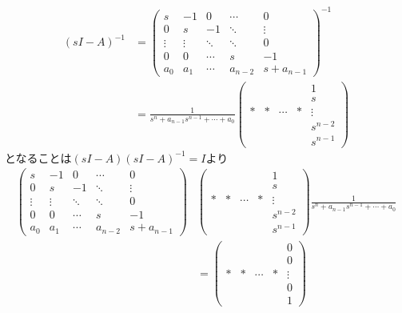 \begin{align}
 (sI-A)^{-1}
 &=
    \left(\begin{array}{ccccc}
     s      & -1     &  0     & \cdots &  0 \\
	 0      &  s     & -1     & \ddots &  \vdots \\
	 \vdots & \vdots & \ddots & \ddots &  0 \\
	 0      &  0     & \cdots & s      & -1 \\
	 a_0    &  a_1   & \cdots & a_{n-2}  &  s+a_{n-1}
	\end{array}\right)^{-1}
\nonumber\\
 &=
    \frac{1}{s^n + a_{n-1} s^{n-1}  + \cdots + a_0}
    \left(\begin{array}{ccccc}
        &    &        &    &  1 \\
	    &    &        &    &  s \\
	  * &  * & \cdots &  * &  \vdots \\
	    &    &        &    &  s^{n-2} \\
	    &    &        &    &  s^{n-1}
	\end{array}\right)
\end{align}
となることは$(sI-A)(sI-A)^{-1}=I$より
\begin{align}
    \left(\begin{array}{ccccc}
     s      & -1     &  0     & \cdots &  0 \\
	 0      &  s     & -1     & \ddots &  \vdots \\
	 \vdots & \vdots & \ddots & \ddots &  0 \\
	 0      &  0     & \cdots & s      & -1 \\
	 a_0    &  a_1   & \cdots & a_{n-2}  &  s+a_{n-1}
	\end{array}\right)
  &
    \left(\begin{array}{ccccc}
        &    &        &    &  1 \\
	    &    &        &    &  s \\
	  * &  * & \cdots &  * &  \vdots \\
	    &    &        &    &  s^{n-2} \\
	    &    &        &    &  s^{n-1}
	\end{array}\right)
    \frac{1}{s^n + a_{n-1} s^{n-1}  + \cdots + a_0}
\nonumber \\
 &=
    \left(\begin{array}{ccccc}
        &    &        &    &  0 \\
	    &    &        &    &  0 \\
	  * &  * & \cdots &  * &  \vdots \\
	    &    &        &    &  0 \\
	    &    &        &    &  1
	\end{array}\right)
\end{align}

